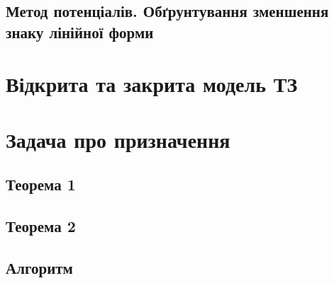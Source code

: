 \documentclass[12pt]{book}
\begin{document}
\subsection{Метод потенціалів. Обґрунтування зменшення знаку лінійної форми}
\section{Відкрита та закрита модель ТЗ}
\section{Задача про призначення}
\subsection{Теорема 1}
\subsection{Теорема 2}
\subsection{Алгоритм}
\end{document}
